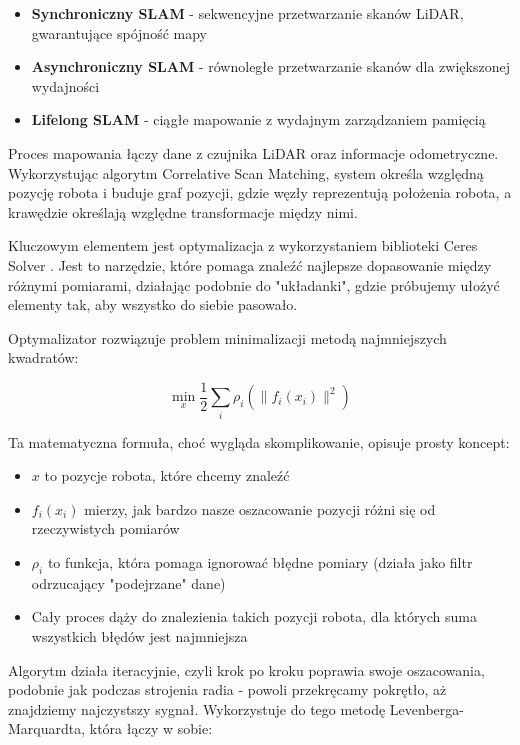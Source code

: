 \documentclass[a4paper,twoside,12pt]{book}
\begin{document}
\begin{itemize}
\item \textbf{Synchroniczny SLAM} - sekwencyjne przetwarzanie skanów LiDAR, gwarantujące spójność mapy
\item \textbf{Asynchroniczny SLAM} - równoległe przetwarzanie skanów dla zwiększonej wydajności
\item \textbf{Lifelong SLAM} - ciągłe mapowanie z wydajnym zarządzaniem pamięcią
\end{itemize}

Proces mapowania łączy dane z czujnika LiDAR oraz informacje odometryczne. Wykorzystując algorytm Correlative Scan Matching, system określa względną pozycję robota i buduje graf pozycji, gdzie węzły reprezentują położenia robota, a krawędzie określają względne transformacje między nimi.

Kluczowym elementem jest optymalizacja z wykorzystaniem biblioteki Ceres Solver \cite{bib:Agarwal_Ceres_Solver_2022}. Jest to narzędzie, które pomaga znaleźć najlepsze dopasowanie między różnymi pomiarami, działając podobnie do "układanki", gdzie próbujemy ułożyć elementy tak, aby wszystko do siebie pasowało.

Optymalizator rozwiązuje problem minimalizacji metodą najmniejszych kwadratów:

\begin{equation}
\min_x \frac{1}{2}\sum_{i} \rho_i(\|f_i(x_i)\|^2)
\end{equation}

Ta matematyczna formuła, choć wygląda skomplikowanie, opisuje prosty koncept:

\begin{itemize}
\item $x$ to pozycje robota, które chcemy znaleźć 
\item $f_i(x_i)$ mierzy, jak bardzo nasze oszacowanie pozycji różni się od rzeczywistych pomiarów
\item $\rho_i$ to funkcja, która pomaga ignorować błędne pomiary (działa jako filtr odrzucający "podejrzane" dane)
\item Cały proces dąży do znalezienia takich pozycji robota, dla których suma wszystkich błędów jest najmniejsza
\end{itemize}

Algorytm działa iteracyjnie, czyli krok po kroku poprawia swoje oszacowania, podobnie jak podczas strojenia radia - powoli przekręcamy pokrętło, aż znajdziemy najczystszy sygnał. Wykorzystuje do tego metodę Levenberga-Marquardta, która łączy w sobie:
\end{document}
